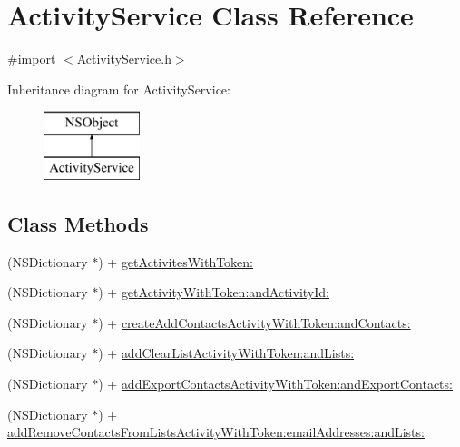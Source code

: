 \hypertarget{interface_activity_service}{\section{Activity\-Service Class Reference}
\label{interface_activity_service}
}


{\ttfamily \#import $<$Activity\-Service.\-h$>$}

Inheritance diagram for Activity\-Service\-:\begin{figure}[H]
\begin{center}
\leavevmode
\includegraphics[height=2.000000cm]{interface_activity_service}
\end{center}
\end{figure}
\subsection*{Class Methods}
\begin{DoxyCompactItemize}
\item 
(N\-S\-Dictionary $\ast$) + \hyperlink{interface_activity_service_aa21c8cebdb28154a3fff38f2c077176e}{get\-Activites\-With\-Token\-:}
\item 
(N\-S\-Dictionary $\ast$) + \hyperlink{interface_activity_service_abb535e31f9c15248ef3f2324fc5905ce}{get\-Activity\-With\-Token\-:and\-Activity\-Id\-:}
\item 
(N\-S\-Dictionary $\ast$) + \hyperlink{interface_activity_service_ab53b151e202d2f6c414cd6e1abc88abb}{create\-Add\-Contacts\-Activity\-With\-Token\-:and\-Contacts\-:}
\item 
(N\-S\-Dictionary $\ast$) + \hyperlink{interface_activity_service_a0b50191767ce7b7e84b6df4514db79f7}{add\-Clear\-List\-Activity\-With\-Token\-:and\-Lists\-:}
\item 
(N\-S\-Dictionary $\ast$) + \hyperlink{interface_activity_service_ac8c4a5d0c7e678bca210420261f0742f}{add\-Export\-Contacts\-Activity\-With\-Token\-:and\-Export\-Contacts\-:}
\item 
(N\-S\-Dictionary $\ast$) + \hyperlink{interface_activity_service_a9d9b6883bacc95cbd324f61ddeebf54f}{add\-Remove\-Contacts\-From\-Lists\-Activity\-With\-Token\-:email\-Addresses\-:and\-Lists\-:}
\end{DoxyCompactItemize}


